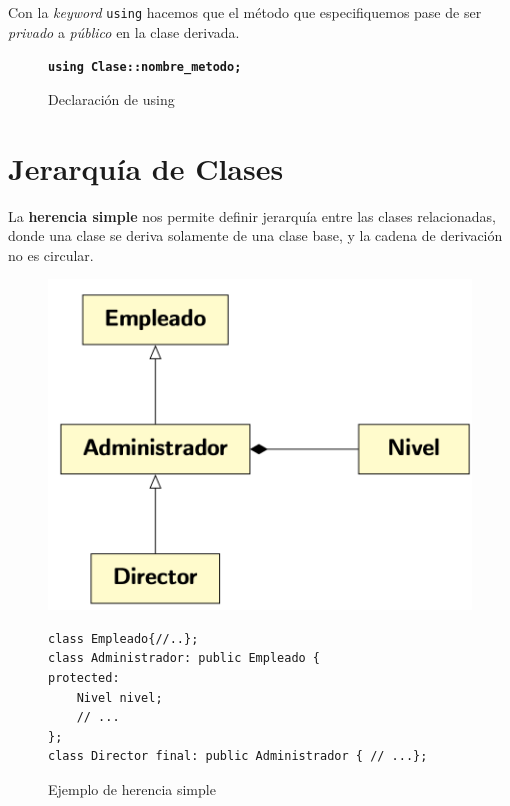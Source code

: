 Con la \textit{keyword} \texttt{using} hacemos que el método que especifiquemos pase de ser \textit{privado} a \textit{público} en la clase derivada.

\begin{figure}[h]
	\centering
	\texttt {\textbf{using Clase::nombre\_metodo;}}
	\caption{Declaración de using}
\end{figure}
\section{Jerarquía de Clases}
La \textbf{herencia simple} nos permite definir jerarquía entre las clases relacionadas, donde una clase se deriva solamente de una clase base, y la cadena de derivación no es circular.


\begin{figure}[h]
	\begin{minipage}[t]{0.45\textwidth}
		\includegraphics[width=\textwidth]{Imagenes/gen6.png}
		\caption{Ejemplo de herencia simple}
	\end{minipage}
	\hfill
	\begin{minipage}[t]{0.45\textwidth}
\vspace{-5cm}
		\begin{lstlisting}[frame=single]
class Empleado{//..};
class Administrador: public Empleado {
protected:
	Nivel nivel;
	// ...
};
class Director final: public Administrador { // ...};
		\end{lstlisting}
	\end{minipage}
\end{figure}

